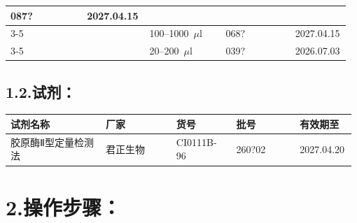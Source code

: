 \documentclass[UTF8,10pt,a4paper,fontset=fandol]{ctexart}
\newcommand{\fieldvalue}[1]{#1}
\newcommand{\handwritten}[1]{#1}
\begin{document}
\begin{center}
\begin{tabular}{|p{0.22\linewidth}|p{0.18\linewidth}|p{0.22\linewidth}|p{0.20\linewidth}|p{0.16\linewidth}|}
\fieldvalue{\handwritten{087?}} &
\fieldvalue{\handwritten{2027.04.15}}\\
\cline{3-5}
& &
\fieldvalue{\handwritten{100--1000~$\mu$l}} &
\fieldvalue{\handwritten{068?}} &
\fieldvalue{\handwritten{2027.04.15}}\\
\cline{3-5}
& &
\fieldvalue{\handwritten{20--200~$\mu$l}} &
\fieldvalue{\handwritten{039?}} &
\fieldvalue{\handwritten{2026.07.03}}\\
\hline
\end{tabular}
\end{center}

\subsection*{1.2.\quad 试剂：}

\begin{center}
\begin{tabular}{|p{0.27\linewidth}|p{0.20\linewidth}|p{0.17\linewidth}|p{0.18\linewidth}|p{0.16\linewidth}|}
\hline
试剂名称 & 厂家 & 货号 & 批号 & 有效期至\\
\hline
胶原酶Ⅱ型定量检测法 & 君正生物 & CI0111B-96 &
\fieldvalue{\handwritten{260?02}} &
\fieldvalue{\handwritten{2027.04.20}}\\
\hline
\end{tabular}
\end{center}

\section*{2.\quad 操作步骤：}
\end{document}
